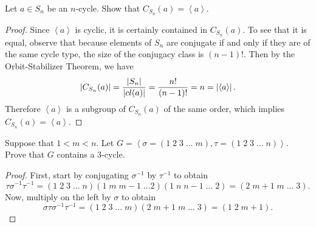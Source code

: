 \documentclass[10pt]{amsart}
\begin{document}
\begin{thm}
  Let $a \in S_n$ be an $n$-cycle.  Show that $C_{S_n}(a) = \left< a \right>$.
  \begin{proof}
    Since $\left< a \right>$ is cyclic, it is certainly contained in $C_{S_n}(a)$.
    To see that it is equal, observe that because elements of $S_n$ are conjugate if and only if they are of the same cycle type, the size of the conjugacy class is $(n-1)!$.
    Then by the Orbit-Stabilizer Theorem, we have $$\left| C_{S_n}(a) \right| = \frac{\left| S_n \right|}{\left| cl(a) \right|} = \frac{n!}{(n-1)!} = n = \left| \left<a\right> \right|.$$
    Therefore $\left<a\right>$ is a subgroup of $C_{S_n}(a)$ of the same order, which implies $C_{S_n}(a) = \left< a \right>$.
  \end{proof}
\end{thm}

\begin{thm}
  Suppose that $1 < m < n$.  Let $G = \left<\sigma = (1\; 2\; 3\; \ldots\; m), \tau = (1\; 2\; 3\; \ldots\; n)\right>$.
  Prove that $G$ contains a 3-cycle.
  \begin{proof}
    First, start by conjugating $\sigma^{-1}$ by $\tau^{-1}$ to obtain
    $$\tau\sigma^{-1}\tau^{-1} = (1\; 2\; 3\; \ldots\; n)(1\; m\; m-1\; \ldots 2)(1\; n\; n-1\; \ldots\; 2) = (2\; m+1\; m\; \ldots\; 3).$$
    Now, multiply on the left by $\sigma$ to obtain
    $$\sigma\tau\sigma^{-1}\tau^{-1} = (1\; 2\; 3\; \ldots\; m)(2\; m+1\; m\; \ldots\; 3) = (1\; 2\; m+1).$$
  \end{proof}
\end{thm}
\end{document}
